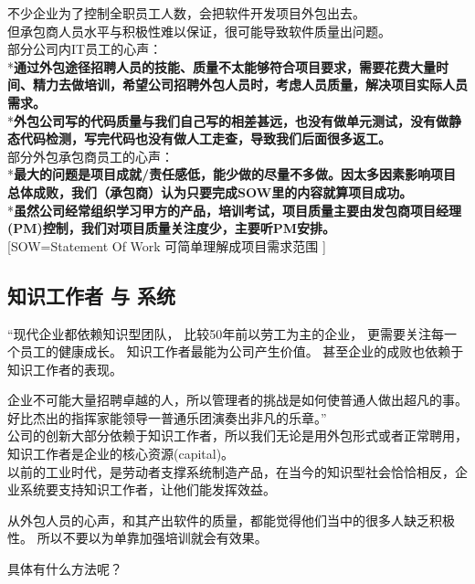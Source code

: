 不少企业为了控制全职员工人数，会把软件开发项目外包出去。\\
但承包商人员水平与积极性难以保证，很可能导致软件质量出问题。\\
部分公司内IT员工的心声：\\
*\textbf{通过外包途径招聘人员的技能、质量不太能够符合项目要求，需要花费大量时间、精力去做培训，希望公司招聘外包人员时，考虑人员质量，解决项目实际人员需求。}\\
*\textbf{外包公司写的代码质量与我们自己写的相差甚远，也没有做单元测试，没有做静态代码检测，写完代码也没有做人工走查，导致我们后面很多返工。}\\
部分外包承包商员工的心声：\\
*\textbf{最大的问题是项目成就/责任感低，能少做的尽量不多做。因太多因素影响项目总体成败，我们（承包商）认为只要完成SOW里的内容就算项目成功。}\\
*\textbf{虽然公司经常组织学习甲方的产品，培训考试，项目质量主要由发包商项目经理(PM)控制，我们对项目质量关注度少，主要听PM安排。}\\
{[}SOW=Statement Of Work 可简单理解成项目需求范围 {]}\\

\hypertarget{ux77e5ux8bc6ux5de5ux4f5cux8005-ux4e0e-ux7cfbux7edf}{%
\subsection{知识工作者 与
系统}\label{ux77e5ux8bc6ux5de5ux4f5cux8005-ux4e0e-ux7cfbux7edf}}

``现代企业都依赖知识型团队， 比较50年前以劳工为主的企业，
更需要关注每一个员工的健康成长。 知识工作者最能为公司产生价值。
甚至企业的成败也依赖于知识工作者的表现。

企业不可能大量招聘卓越的人，所以管理者的挑战是如何使普通人做出超凡的事。好比杰出的指挥家能领导一普通乐团演奏出非凡的乐章。''\\
公司的创新大部分依赖于知识工作者，所以我们无论是用外包形式或者正常聘用，知识工作者是企业的核心资源(capital)。\\
以前的工业时代，是劳动者支撑系统制造产品，在当今的知识型社会恰恰相反，企业系统要支持知识工作者，让他们能发挥效益。

从外包人员的心声，和其产出软件的质量，都能觉得他们当中的很多人缺乏积极性。
所以不要以为单靠加强培训就会有效果。

具体有什么方法呢？


